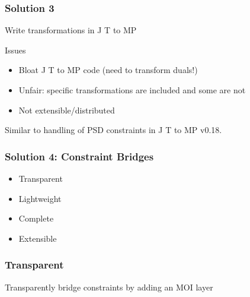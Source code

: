 \documentclass{beamer}
\makeatletter
\newcommand{\JuMP}
{
J%
{%
  \sbox \z@ T%
  \vbox to\ht \z@ {%
    \hbox {%
      \check@mathfonts%
      \math@fontsfalse%
      \selectfont%
      u%
    }%
    \vss%
  }%
}%
MP
}
\makeatother
\begin{document}
\begin{frame}
  \frametitle{Solution 3}
  Write transformations in \JuMP{}
  \begin{block}{Issues}
    \begin{itemize}
      \item Bloat \JuMP{} code (need to transform duals!)
      \item Unfair: specific transformations are included and some are not
      \item Not extensible/distributed
    \end{itemize}
  \end{block}
  Similar to handling of PSD constraints in \JuMP{} v0.18.
\end{frame}

\begin{frame}
  \frametitle{Solution 4: Constraint Bridges}
  \begin{itemize}
      \item Transparent
      \item Lightweight
      \item Complete
      \item Extensible
  \end{itemize}
\end{frame}

\begin{frame}
  \frametitle{Transparent}
  Transparently bridge constraints by adding an MOI layer
  \begin{center}
  \end{center}
\end{frame}
\end{document}
